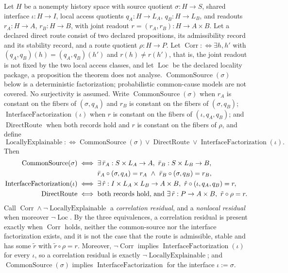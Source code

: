 \begin{theorem}\label{thm:F49}
Let \(H\) be a nonempty history space with source quotient
\(\sigma:H\to S\), shared interface \(\iota:H\to I\), local access
quotients
\(q_A:H\to L_A\), \(q_B:H\to L_B\), and readouts
\(r_A:H\to A\), \(r_B:H\to B\), with joint readout
\(r=(r_A,r_B):H\to A\times B\). Let a declared direct route consist of
two declared propositions, its admissibility record and its stability record, and a route quotient
\(\rho:H\to P\). Let \(\operatorname{Corr}:\Longleftrightarrow\exists h,h'\) with
\((q_A,q_B)(h)=(q_A,q_B)(h')\) and \(r(h)\ne r(h')\), that is, the joint
readout is not fixed by the two local access classes, and let
\(\operatorname{Loc}\) be the declared locality package, a proposition the
theorem does not analyse. \(\operatorname{CommonSource}(\sigma)\) below is a
deterministic factorization; probabilistic common-cause models are not
covered. No surjectivity is assumed. Write \(\operatorname{CommonSource}(\sigma)\) when \(r_A\) is
constant on the fibers of \((\sigma,q_A)\) and \(r_B\) is constant on the
fibers of \((\sigma,q_B)\); \(\operatorname{InterfaceFactorization}(\iota)\)
when \(r\) is constant on the fibers of \((\iota,q_A,q_B)\); and
\(\operatorname{DirectRoute}\) when both records hold and
\(r\) is constant on the fibers of \(\rho\), and define
\[
  \operatorname{LocallyExplainable}
  :\iff \operatorname{CommonSource}(\sigma)\vee\operatorname{DirectRoute}
    \vee \operatorname{InterfaceFactorization}(\iota).
\]
Then
\begin{align*}
  \operatorname{CommonSource}(\sigma)
  &\iff
  \exists\,\bar r_A:S\times L_A\to A,\ \bar r_B:S\times L_B\to B,\\
  &\hphantom{{}\iff{}}
    \bar r_A\circ(\sigma,q_A)=r_A\ \wedge\ \bar r_B\circ(\sigma,q_B)=r_B,\\
  \operatorname{InterfaceFactorization}(\iota)
  &\iff
  \exists\,\hat r:I\times L_A\times L_B\to A\times B,\
    \hat r\circ(\iota,q_A,q_B)=r,\\
  \operatorname{DirectRoute}
  &\iff
  \text{both records hold, and}\
    \exists\,\tilde r:P\to A\times B,\ \tilde r\circ\rho=r.
\end{align*}
Call \(\operatorname{Corr}\wedge\neg\operatorname{LocallyExplainable}\) a
\emph{correlation residual}, and a \emph{nonlocal residual} when moreover
\(\neg\operatorname{Loc}\). By the three equivalences, a correlation residual
is present exactly when \(\operatorname{Corr}\) holds, neither the common-source
nor the interface factorization exists, and it is not the case that the route
is admissible, stable and has some \(\tilde r\) with \(\tilde r\circ\rho=r\).
Moreover, \(\neg\operatorname{Corr}\) implies \(\operatorname{InterfaceFactorization}(\iota)\)
for every \(\iota\), so a correlation residual is exactly
\(\neg\operatorname{LocallyExplainable}\); and \(\operatorname{CommonSource}(\sigma)\)
implies \(\operatorname{InterfaceFactorization}\) for the interface \(\iota:=\sigma\).
\end{theorem}
